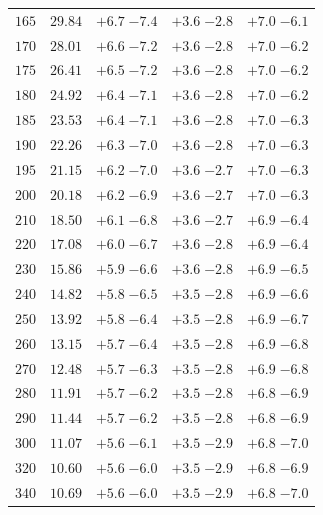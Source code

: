 \begin{table}
\begin{center}
\begin{tabular}{ccccc}
 $165 $&$ 29.84 $& $ {+ 6.7}  \;{- 7.4} $ & $ {+ 3.6}  \;{- 2.8} $ & $ {+ 7.0}  \;{- 6.1} $ \\
 $170 $&$ 28.01 $& $ {+ 6.6}  \;{- 7.2} $ & $ {+ 3.6}  \;{- 2.8} $ & $ {+ 7.0}  \;{- 6.2} $ \\
 $175 $&$ 26.41 $& $ {+ 6.5}  \;{- 7.2} $ & $ {+ 3.6}  \;{- 2.8} $ & $ {+ 7.0}  \;{- 6.2} $ \\
 $180 $&$ 24.92 $& $ {+ 6.4}  \;{- 7.1} $ & $ {+ 3.6}  \;{- 2.8} $ & $ {+ 7.0}  \;{- 6.2} $ \\
 $185 $&$ 23.53 $& $ {+ 6.4}  \;{- 7.1} $ & $ {+ 3.6}  \;{- 2.8} $ & $ {+ 7.0}  \;{- 6.3} $ \\
 $190 $&$ 22.26 $& $ {+ 6.3}  \;{- 7.0} $ & $ {+ 3.6}  \;{- 2.8} $ & $ {+ 7.0}  \;{- 6.3} $ \\
 $195 $&$ 21.15 $& $ {+ 6.2}  \;{- 7.0} $ & $ {+ 3.6}  \;{- 2.7} $ & $ {+ 7.0}  \;{- 6.3} $ \\
 $200 $&$ 20.18 $& $ {+ 6.2}  \;{- 6.9} $ & $ {+ 3.6}  \;{- 2.7} $ & $ {+ 7.0}  \;{- 6.3} $ \\
 $210 $&$ 18.50 $& $ {+ 6.1}  \;{- 6.8} $ & $ {+ 3.6}  \;{- 2.7} $ & $ {+ 6.9}  \;{- 6.4} $ \\
 $220 $&$ 17.08 $& $ {+ 6.0}  \;{- 6.7} $ & $ {+ 3.6}  \;{- 2.8} $ & $ {+ 6.9}  \;{- 6.4} $ \\ 
 $230 $&$ 15.86 $& $ {+ 5.9}  \;{- 6.6} $ & $ {+ 3.6}  \;{- 2.8} $ & $ {+ 6.9}  \;{- 6.5} $ \\
 $240 $&$ 14.82 $& $ {+ 5.8}  \;{- 6.5} $ & $ {+ 3.5}  \;{- 2.8} $ & $ {+ 6.9}  \;{- 6.6} $ \\
 $250 $&$ 13.92 $& $ {+ 5.8}  \;{- 6.4} $ & $ {+ 3.5}  \;{- 2.8} $ & $ {+ 6.9}  \;{- 6.7} $ \\
 $260 $&$ 13.15 $& $ {+ 5.7}  \;{- 6.4} $ & $ {+ 3.5}  \;{- 2.8} $ & $ {+ 6.9}  \;{- 6.8} $ \\
 $270 $&$ 12.48 $& $ {+ 5.7}  \;{- 6.3} $ & $ {+ 3.5}  \;{- 2.8} $ & $ {+ 6.9}  \;{- 6.8} $ \\
 $280 $&$ 11.91 $& $ {+ 5.7}  \;{- 6.2} $ & $ {+ 3.5}  \;{- 2.8} $ & $ {+ 6.8}  \;{- 6.9} $ \\
 $290 $&$ 11.44 $& $ {+ 5.7}  \;{- 6.2} $ & $ {+ 3.5}  \;{- 2.8} $ & $ {+ 6.8}  \;{- 6.9} $ \\
 $300 $&$ 11.07 $& $ {+ 5.6}  \;{- 6.1} $ & $ {+ 3.5}  \;{- 2.9} $ & $ {+ 6.8}  \;{- 7.0} $ \\
 $320 $&$ 10.60 $& $ {+ 5.6}  \;{- 6.0} $ & $ {+ 3.5}  \;{- 2.9} $ & $ {+ 6.8}  \;{- 6.9} $ \\
 $340 $&$ 10.69 $& $ {+ 5.6}  \;{- 6.0} $ & $ {+ 3.5}  \;{- 2.9} $ & $ {+ 6.8}  \;{- 7.0} $ \\

\end{tabular}
\end{center}
\end{table}
